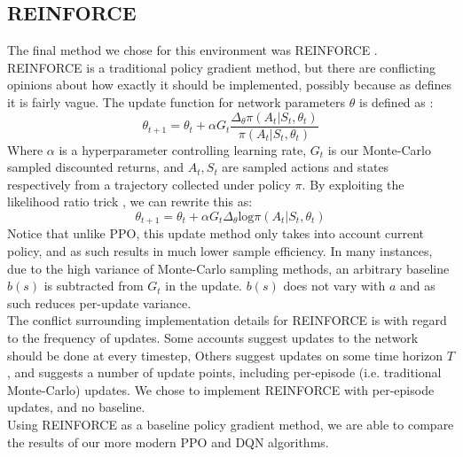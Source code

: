 \documentclass{article}
\begin{document}
\subsection{REINFORCE}
The final method we chose for this environment was REINFORCE \citep{williams1992simple}. REINFORCE is a traditional policy gradient method, but there are conflicting opinions about how exactly it should be implemented, possibly because as \citet{williams1992simple} defines it is fairly vague. The update function for network parameters $\theta$ is defined as \citep{10.5555/3312046}:
\begin{equation}
\theta_{t+1} = \theta_{t} + \alpha G_t\frac{\Delta_\theta\pi(A_t| S_t, \theta_t)}{\pi(A_t| S_t, \theta_t)}
\end{equation}
Where $\alpha$ is a hyperparameter controlling learning rate, $G_t$ is our Monte-Carlo sampled discounted returns, and $A_t,S_t$ are sampled actions and states respectively from a trajectory collected under policy $\pi$. By exploiting the likelihood ratio trick \citep{silver2015}, we can rewrite this as:
\begin{equation}
  \theta_{t+1} = \theta_{t} + \alpha G_t\Delta_\theta \text{log} \pi(A_t | S_t, \theta_t)
\end{equation}
Notice that unlike PPO, this update method only takes into account current policy, and as such results in much lower sample efficiency. In many instances, due to the high variance of Monte-Carlo sampling methods, an arbitrary baseline $b(s)$ is subtracted from $G_t$ in the update. $b(s)$ does not vary with $a$ and as such reduces per-update variance. \\\newline
The conflict surrounding implementation details for REINFORCE is with regard to the frequency of updates. Some accounts \citep{10.5555/3312046} suggest updates to the network should be done at every timestep, Others \citep{silver2015} suggest updates on some time horizon $T$, and \citet{williams1992simple} suggests a number of update points, including per-episode (i.e. traditional Monte-Carlo) updates. We chose to implement REINFORCE with per-episode updates, and no baseline. \\\newline
Using REINFORCE as a baseline policy gradient method, we are able to compare the results of our more modern PPO and DQN algorithms.
\end{document}

